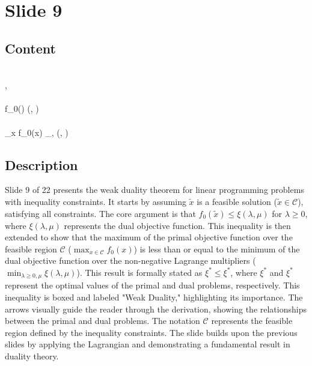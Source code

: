 \documentclass{article}%
\begin{document}
%
\newpage%
\section{Slide 9}%
\label{sec:Slide9}%
\subsection{Content}%

 \\
  \in {},  \\
\lambda {} \\
f_0() \le \xi(\lambda, \mu) \quad \lambda {} \\
 \\
\max_{x \in {}} f_0(x) \le \min_{\lambda {}, \mu} \xi(\lambda, \mu) \\
\boxed{\xi^* \le \xi^*} \quad {}
%
\subsection{Description}%
Slide 9 of 22 presents the weak duality theorem for linear programming problems with inequality constraints.  It starts by assuming $\tilde{x}$ is a feasible solution ($\tilde{x} \in \mathcal{C}$), satisfying all constraints.  The core argument is that $f_0(\tilde{x}) \le \xi(\lambda, \mu)$ for $\lambda \ge 0$, where $\xi(\lambda, \mu)$ represents the dual objective function.  This inequality is then extended to show that the maximum of the primal objective function over the feasible region $\mathcal{C}$ ($\max_{x \in \mathcal{C}} f_0(x)$) is less than or equal to the minimum of the dual objective function over the non-negative Lagrange multipliers ($\min_{\lambda \ge 0, \mu} \xi(\lambda, \mu)$). This result is formally stated as $\xi^* \le \xi^*$, where $\xi^*$ and $\xi^*$ represent the optimal values of the primal and dual problems, respectively.  This inequality is boxed and labeled "Weak Duality," highlighting its importance. The arrows visually guide the reader through the derivation, showing the relationships between the primal and dual problems. The notation $\mathcal{C}$ represents the feasible region defined by the inequality constraints.  The slide builds upon the previous slides by applying the Lagrangian and demonstrating a fundamental result in duality theory.%
\end{document}
